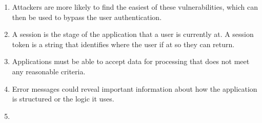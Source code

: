 \begin{enumerate}
    \item Attackers are more likely to find the easiest of these vulnerabilities, which can then be used to bypass the user authentication.
    \item A session is the stage of the application that a user is currently at. A session token is a string that identifies where the user if at so they can return.
    \item Applications must be able to accept data for processing that does not meet any reasonable criteria.
    \item Error messages could reveal important information about how the application is structured or the logic it uses.
    \item 
\end{enumerate}